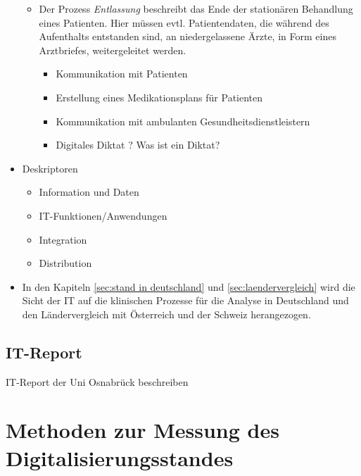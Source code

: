 \begin{itemize}
\begin{itemize}
				\item Der Prozess \textit{Entlassung} beschreibt das Ende der stationären Behandlung eines Patienten. Hier müssen evtl. Patientendaten, die während des Aufenthalts entstanden sind, an niedergelassene Ärzte, in Form eines Arztbriefes, weitergeleitet werden. 
				\begin{itemize}
					\item Kommunikation mit Patienten
					\item Erstellung eines Medikationsplans für Patienten
					\item Kommunikation mit ambulanten Gesundheitsdienstleistern
					\item Digitales Diktat ? Was ist ein Diktat?
				\end{itemize}
			\end{itemize}
			\item Deskriptoren
		\begin{itemize} 
			\item Information und Daten
			\item IT-Funktionen/Anwendungen
			\item Integration
			\item Distribution
		\end{itemize}
		\item In den Kapiteln \ref{sec:stand in deutschland} und \ref{sec:laendervergleich} wird die Sicht der IT auf die klinischen Prozesse für die Analyse in Deutschland und den Ländervergleich mit Österreich und der Schweiz herangezogen.
		\end{itemize}
	\subsection{IT-Report}
	IT-Report der Uni Osnabrück beschreiben
\section{Methoden zur Messung des Digitalisierungsstandes}
